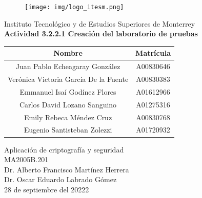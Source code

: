 \documentclass{article}
\begin{document}
    \begin{titlepage}
        \begin{center}
            \begin{figure}
                \centering
                \texttt{[image: img/logo\_itesm.png]}\\ %
            \end{figure}
        \vspace{5cm}
        \LARGE{Instituto Tecnológico y de Estudios Superiores de Monterrey}\\
        \fontsize{12}{14}\selectfont
        \vspace{1cm}
        \textbf{Actividad 3.2.2.1 Creación del laboratorio de pruebas}\\ %
        \vspace{0.7cm}
        \begin{table}[h!]
            \centering
            \begin{tabular}{ ||c|c|| }
                \hline
                Nombre & Matrícula \\
                \hline
                Juan Pablo Echeagaray González & A00830646 \\
                \hline
                Verónica Victoria García De la Fuente & A00830383 \\
                \hline
                Emmanuel Isaí Godínez Flores & A01612966 \\
                \hline
                Carlos David Lozano Sanguino & A01275316 \\
                \hline
                Emily Rebeca Méndez Cruz & A00830768 \\
                \hline
                Eugenio Santisteban Zolezzi & A01720932 \\
                \hline
            \end{tabular}
        \end{table}
        \vspace{0.7cm}
        Aplicación de criptografía y seguridad\\ %
        \vspace{0.2cm}
        MA2005B.201\\ %
        \vspace{0.2cm}
        Dr. Alberto Francisco Martínez Herrera\\ %
        \vspace{0.2cm}
        Dr. Oscar Eduardo Labrado Gómez \\
        \vspace{0.7cm}
        28 de septiembre del 20222\\ %
        \end{center}
    \end{titlepage}
\end{document}
